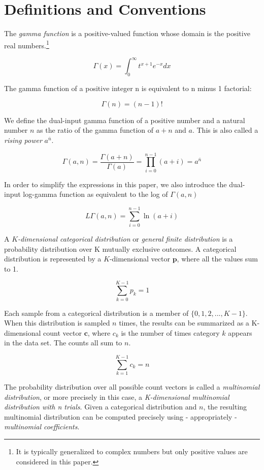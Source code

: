 \documentclass[twoside]{article}
\begin{document}
\section{Definitions and Conventions}

The \textit{gamma function} is a positive-valued function whose domain is the positive real numbers.\footnote{It is typically generalized to complex numbers but only positive values are considered in this paper.}

\[\Gamma(x)=\int_0^\infty t^{x+1}e^{-x}dx\]

The gamma function of a positive integer n is equivalent to n minus 1 factorial:

\[\Gamma(n)=(n-1)!\]

We define the dual-input gamma function of a positive number and a natural number \(n\) as the ratio of the gamma function of \(a + n\) and \(a\). This is also called a \textit{rising power}\cite{concrete} \(a^{\bar{n}}\).

\[\Gamma(a,n)=\frac{\Gamma(a+n)}{\Gamma(a)}=\prod_{i=0}^{n-1}(a+i)=a^{\bar{n}}\]

In order to simplify the expressions in this paper, we also introduce the dual-input log-gamma function as equivalent to the log of \(\Gamma(a, n)\)

\[L\Gamma(a,n)=\sum_{i=0}^{n-1}\ln(a+i)\]

A \textit{\(K\)-dimensional categorical distribution} or \textit{general finite distribution}\cite{ng} is a probability distribution over K mutually exclusive outcomes.  A categorical distribution is represented by a \(K\)-dimensional vector $\mathbf{p}$, where all the values sum to 1.

\[\sum_{k=0}^{K-1}p_k=1\]

Each sample from a categorical distribution is a member of \(\{0, 1, 2, ..., K-1\}\). When this distribution is sampled \(n\) times, the results can be summarized as a K-dimensional count vector \(\mathbf{c}\), where \(c_k\) is the number of times category \(k\) appears in the data set. The counts all sum to $n$.

\[\sum_{k=1}^{K-1}c_k=n\]

The probability distribution over all possible count vectors is called a \textit{multinomial distribution}, or more precisely in this case, a \textit{K-dimensional multinomial distribution with n trials}. Given a categorical distribution and \(n\), the resulting multinomial distribution can be computed precisely using - appropriately - \textit{multinomial coefficients}.
\end{document}
